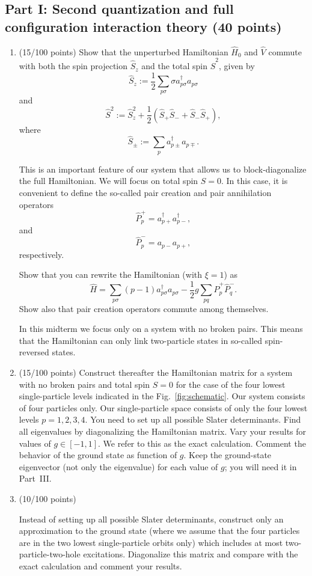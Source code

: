 \documentclass[prc]{revtex4} \usepackage[dvips]{graphicx}
\begin{document}
\subsection*{Part I: Second quantization and full configuration interaction theory (40 points)}

\begin{enumerate}
\item (15/100 points) Show that the unperturbed Hamiltonian $\hat{H}_0$ and $\hat{V}$
  commute with both the spin projection $\hat{S}_z$ and the total spin
  $\hat{S}^2$, given by
\[
  \hat{S}_z := \frac{1}{2}\sum_{p\sigma} \sigma
  a^\dag_{p\sigma}a_{p\sigma}
\]
and
\[
  \hat{S}^2 := \hat{S}_z^2 + \frac{1}{2}(\hat{S}_+\hat{S}_- +
  \hat{S}_-\hat{S}_+),
\]
where
\[
  \hat{S}_\pm := \sum_{p} a^\dag_{p\pm} a_{p\mp}.
\]

This is an important feature of our system that allows us to
block-diagonalize the full Hamiltonian. We will focus on total spin
$S=0$.  In this case, it is convenient to define the so-called pair
creation and pair annihilation operators
\[
\hat{P}^{+}_p = a^\dag_{p+}a^\dag_{p-},
\]
and
\[
\hat{P}^{-}_p = a_{p-}a_{p+},
\] 
respectively.

Show that you can rewrite the Hamiltonian (with $\xi=1$) as
\[
\hat{H}=\sum_{p\sigma}(p-1)a_{p\sigma}^{\dagger}a_{p\sigma}
-\frac{1}{2}g\sum_{pq}\hat{P}^{+}_p\hat{P}^{-}_q.
\]
Show also that pair creation operators  commute among themselves.

In this midterm we focus only on a 
system with no broken pairs. This means that the Hamiltonian can only
link two-particle states in so-called spin-reversed states.


\item (15/100 points) Construct thereafter the Hamiltonian matrix for a system with no
  broken pairs and total spin $S=0$ for the case of the four lowest
  single-particle levels indicated in the
  Fig.~\ref{fig:schematic}. Our system consists of four particles
  only.  Our single-particle space consists of only the four lowest
  levels $p=1,2,3,4$.  You need to set up all possible Slater
  determinants.  Find all eigenvalues by diagonalizing the Hamiltonian
  matrix.  Vary your results for values of $g\in [-1,1]$.  We refer to
  this as the exact calculation. Comment the behavior of the ground
  state as function of $g$. Keep the ground-state eigenvector (not
  only the eigenvalue) for each value of $g$; you will need it in Part~III.

\item  (10/100 points)

Instead of setting up all possible Slater determinants, construct only
an approximation to the ground state (where we assume that the four
particles are in the two lowest single-particle orbits only) which
includes at most two-particle-two-hole excitations. Diagonalize this
matrix and compare with the exact calculation and comment your
results. 


\end{enumerate}
\end{document}
